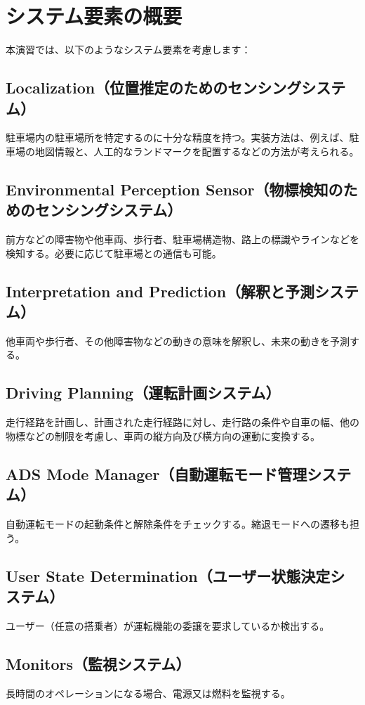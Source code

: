 \section{システム要素の概要}

本演習では、以下のようなシステム要素を考慮します：

\subsection{Localization（位置推定のためのセンシングシステム）}
駐車場内の駐車場所を特定するのに十分な精度を持つ。実装方法は、例えば、駐車場の地図情報と、人工的なランドマークを配置するなどの方法が考えられる。

\subsection{Environmental Perception Sensor（物標検知のためのセンシングシステム）}
前方などの障害物や他車両、歩行者、駐車場構造物、路上の標識やラインなどを検知する。必要に応じて駐車場との通信も可能。

\subsection{Interpretation and Prediction（解釈と予測システム）}
他車両や歩行者、その他障害物などの動きの意味を解釈し、未来の動きを予測する。

\subsection{Driving Planning（運転計画システム）}
走行経路を計画し、計画された走行経路に対し、走行路の条件や自車の幅、他の物標などの制限を考慮し、車両の縦方向及び横方向の運動に変換する。

\subsection{ADS Mode Manager（自動運転モード管理システム）}
自動運転モードの起動条件と解除条件をチェックする。縮退モードへの遷移も担う。

\subsection{User State Determination（ユーザー状態決定システム）}
ユーザー（任意の搭乗者）が運転機能の委譲を要求しているか検出する。

\subsection{Monitors（監視システム）}
長時間のオペレーションになる場合、電源又は燃料を監視する。

